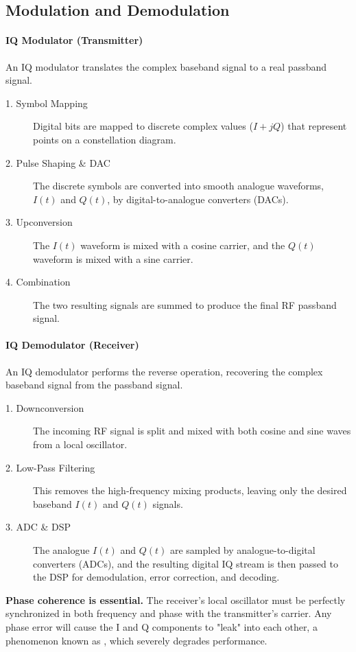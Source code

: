 \subsection{Modulation and Demodulation}

\paragraph{IQ Modulator (Transmitter)}
An IQ modulator translates the complex baseband signal to a real passband signal.
\begin{description}
    \item[1. Symbol Mapping] Digital bits are mapped to discrete complex values ($I+jQ$) that represent points on a constellation diagram.
    \item[2. Pulse Shaping \& DAC] The discrete symbols are converted into smooth analogue waveforms, $I(t)$ and $Q(t)$, by digital-to-analogue converters (DACs).
    \item[3. Upconversion] The $I(t)$ waveform is mixed with a cosine carrier, and the $Q(t)$ waveform is mixed with a sine carrier.
    \item[4. Combination] The two resulting signals are summed to produce the final RF passband signal.
\end{description}

\paragraph{IQ Demodulator (Receiver)}
An IQ demodulator performs the reverse operation, recovering the complex baseband signal from the passband signal.
\begin{description}
    \item[1. Downconversion] The incoming RF signal is split and mixed with both cosine and sine waves from a local oscillator.
    \item[2. Low-Pass Filtering] This removes the high-frequency mixing products, leaving only the desired baseband $I(t)$ and $Q(t)$ signals.
    \item[3. ADC \& DSP] The analogue $I(t)$ and $Q(t)$ are sampled by analogue-to-digital converters (ADCs), and the resulting digital IQ stream is then passed to the DSP for demodulation, error correction, and decoding.
\end{description}

\begin{warningbox}
    \textbf{Phase coherence is essential.} The receiver's local oscillator must be perfectly synchronized in both frequency and phase with the transmitter's carrier. Any phase error will cause the I and Q components to "leak" into each other, a phenomenon known as , which severely degrades performance.
\end{warningbox}

